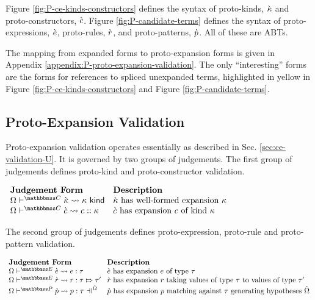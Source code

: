 Figure \ref{fig:P-ce-kinds-constructors} defines the syntax of proto-kinds, ${\grave\kappa}$ and proto-constructors, ${\grave c}$. Figure \ref{fig:P-candidate-terms} defines the syntax of proto-expressions, $\grave{e}$, proto-rules, $\grave{r}$, and proto-patterns, $\grave{p}$. All of these are ABTs. %

The mapping from expanded forms to proto-expansion forms is given in Appendix \ref{appendix:P-proto-expansion-validation}. The only ``interesting'' forms are the forms for references to spliced unexpanded terms, highlighted in yellow in Figure \ref{fig:P-ce-kinds-constructors} and Figure \ref{fig:P-candidate-terms}.

\subsection{Proto-Expansion Validation}
Proto-expansion validation operates essentially as described in Sec. \ref{sec:ce-validation-U}. It is governed by two groups of judgements. The first group of judgements defines proto-kind and proto-constructor validation.

\vspace{10px}\noindent
$\begin{array}{ll}
\textbf{Judgement Form} & \textbf{Description}\\
\cvalidKX{\cekappa}{\kappa} & \text{$\cekappa$ has well-formed expansion $\kappa$}\\
\cvalidCX{\cec}{c}{\kappa} & \text{$\cec$ has expansion $c$ of kind $\kappa$}\\
\end{array}$
\vspace{10px}

The second group of judgements defines proto-expression, proto-rule and proto-pattern validation.

\vspace{10px}\noindent
$\arraycolsep=4pt\begin{array}{ll}
\textbf{Judgement Form} & \textbf{Description}\\
\cvalidEPX{\ce}{e}{\tau} & \text{$\ce$ has expansion $e$ of type $\tau$}\\
\cvalidRP{\Omega}{\escenev}{\crv}{r}{\tau}{\tau'} & \text{$\crv$ has expansion $r$ taking values of type $\tau$ to values of type $\tau'$}\\
\cvalidPPE{\uOmega}{\pscenev}{\cpv}{p}{\tau} & \text{$\cpv$ has expansion $p$ matching against $\tau$ generating hypotheses $\uOmega$}
\end{array}$
\vspace{10px}

